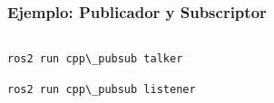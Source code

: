 \begin{frame}[fragile]
    \frametitle{Ejemplo: Publicador y Subscriptor}
    
    \begin{columns}
        \begin{column}{0.5\textwidth}
            
        \end{column}
        \begin{column}{0.5\textwidth}
            
        \end{column}
    \end{columns}
    
\begin{lstlisting}[style=bash] 
ros2 run cpp\_pubsub talker
\end{lstlisting}

\begin{lstlisting}[style=bash] 
ros2 run cpp\_pubsub listener
\end{lstlisting}
\end{frame}


